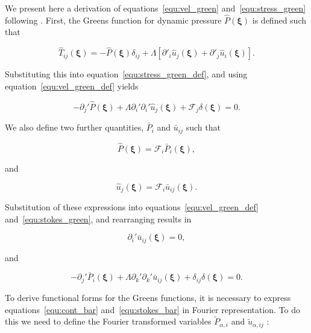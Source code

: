 \documentclass[12pt]{article}
\begin{document}
We present here a derivation of equations~\ref{equ:vel_green} and~\ref{equ:stress_green} following \citet{Ladyzhenskaya63}. First, the Greens function for dynamic pressure $\hat{P}(\boldsymbol{\xi})$ is defined such that

\begin{equation}
\label{equ:press_green_def}
\hat{T}_{ij}(\boldsymbol{\xi}) = - \hat{P}(\boldsymbol{\xi}) \delta_{ij} + \Lambda[\partial'_{i} \hat{u}_{j}(\boldsymbol{\xi}) + \partial'_{j} \hat{u}_{i}(\boldsymbol{\xi})] .
\end{equation}


Substituting this into equation~\ref{equ:stress_green_def}, and using equation~\ref{equ:vel_green_def} yields 

\begin{equation}
\label{equ:stokes_green}
-\partial_{j}' \hat{P}(\boldsymbol{\xi}) + \Lambda \partial_{i}' \partial_{i}' \hat{u}_{j}(\boldsymbol{\xi}) + \mathcal{F}_{j} \delta(\boldsymbol{\xi}) = 0 .
\end{equation}


We also define two further quantities, $\bar{P}_{i}$ and $\bar{u}_{ij}$ such that

\begin{equation}
\label{equ:pres_bar}
\hat{P} (\boldsymbol{\xi}) = \mathcal{F}_{i} \bar{P}_{i} (\boldsymbol{\xi}) ,
\end{equation}

and 

\begin{equation}
\label{equ:vel_bar}
\hat{u}_{j}(\boldsymbol{\xi}) = \mathcal{F}_{i} \bar{u}_{ij} (\boldsymbol{\xi}) .
\end{equation}

Substitution of these expressions into equations~\ref{equ:vel_green_def} and~\ref{equ:stokes_green}, and rearranging results in

\begin{equation}
\label{equ:cont_bar}
\partial_{i}' \bar{u}_{ij} (\boldsymbol\xi)  = 0 ,
\end{equation}

and

\begin{equation}
\label{equ:stokes_bar}
-\partial_{j}' \bar{P}_{i} (\boldsymbol\xi) + \Lambda \partial_{k}' \partial_{k}' \bar{u}_{ij} (\boldsymbol\xi) + \delta_{ij} \delta(\boldsymbol\xi) = 0 .
\end{equation}

To derive functional forms for the Greens functions, it is necessary to express equations~\ref{equ:cont_bar} and~\ref{equ:stokes_bar} in Fourier representation. To do this we need to define the Fourier transformed variables $\tilde{P}_{\alpha, i}$ and $\tilde{u}_{\alpha,ij}$ \citep{Riley06}:
\end{document}
